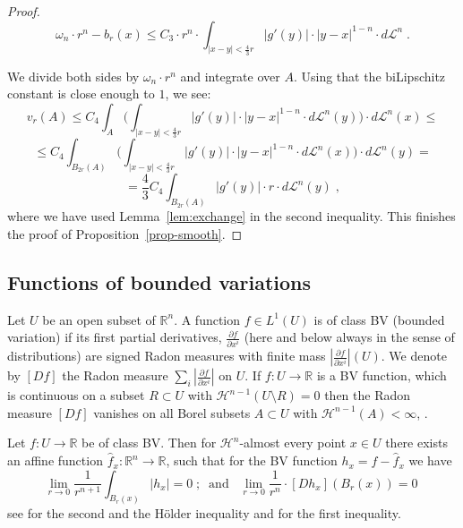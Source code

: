 \documentclass[12pt,leqno,intlimits]{amsart}
\numberwithin{equation}{section}
\theoremstyle{definition}
\theoremstyle{remark}
\newtheorem{rem}[thm]{Remark}
\newcommand{\lref}[1]{Lemma~\ref{#1}}
\newcommand{\R}{\mathbb{R}}
\def\co{\colon\thinspace}
\def\:{\colon}
\begin{document}
\begin{proof}
\[
\omega _n \cdot r^n - b_r (x) \leq C_3\cdot r^n \cdot \int _{|x-y|< \frac 4 3 r}  |g'(y)| \cdot |y-x|^{1-n} \cdot d\mathcal L^n \; .
\]

We divide both sides  by $\omega _n \cdot  r^n$ and integrate over $A$. Using that the biLipschitz constant is close enough to $1$,  we see:
$$v_r (A) \leq C_4 \int _A  \Big (\int _{|x-y|< \frac 4 3 r}  |g'(y)|  \cdot |y-x|^{1-n}\cdot d\mathcal L^n (y) \Big ) \cdot d\mathcal L^n (x)  \leq$$
$$\leq C_4 \int _{B_{2r} (A)} \Big ( \int  _{|x-y|< \frac 4 3 r} |g'(y)|  \cdot |y-x|^{1-n} \cdot d\mathcal L^n (x) \Big ) \cdot d\mathcal L^n (y) = $$
$$= \frac 4 3 C_4 \int _{B_{2r} (A)} |g'(y)| \cdot r \cdot d\mathcal L^n (y) \; ,$$
where we have used \lref{lem:exchange} in the second inequality.
   This  finishes the proof of  Proposition~\ref{prop-smooth}.
\end{proof}



\subsection{Functions of bounded variations}
Let $U$ be an open subset of $\R^n$. A function $f\in L^1 (U)$ is of class  BV (bounded variation) if its first partial derivatives,
 $\frac{\partial f}{\partial x^i}$ (here and below always in the sense of distributions) are signed Radon measures with finite mass
 $|\frac{\partial f}{\partial x^i}|(U)$. We denote by $[Df ]$ the Radon measure $\sum_i |\frac{\partial f}{\partial x^i}|$ on $U$.  
 If $f\:U\to \R$ is a BV function, which is continuous on a subset $R \subset U$ with $\mathcal H^{n-1} (U\setminus R)=0$ then the Radon measure $[Df]$ vanishes on all Borel subsets $A\subset U$ with $\mathcal H^{n-1} (A)<\infty$, \cite{Goffmann}.

Let $f\:U\to \R$ be of class BV.  Then  for $\mathcal H^n$-almost every point
$x\in U$ there exists an affine  function $\hat f _x\:\R^n\to \R$, such that for the BV function $h_x=f-\hat f_x$  we have
\begin{equation}\label{DC-ae-diff}
\lim_{r\to 0}\frac 1 {r^{n+1}}  \int _{B_r(x)}|h_x| =0 \; ;\; \;  \text{and} \;  \; \;    \lim _{r\to 0}  \frac 1 {r^n} \cdot   [Dh_x] (B_r (x)) =0 \;
\end{equation}
see \cite[ Theorem 6.1 (2),(3)]{Evans}  for the second and   the H\"older inequality and  \cite[ Theorem 6.1 (1)]{Evans}  for the first inequality.
\end{document}
